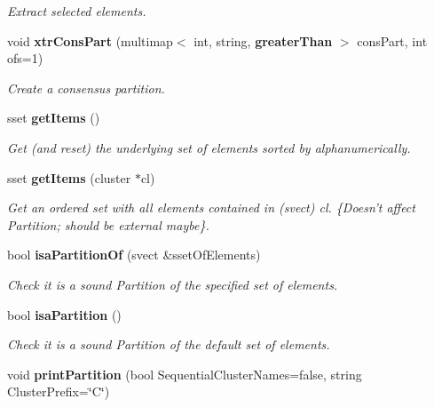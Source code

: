 \begin{CompactItemize}
\begin{CompactList}\small\item\em Extract selected elements. \item\end{CompactList}\item 
void {\bf xtr\-Cons\-Part} (multimap$<$ int, string, {\bf greater\-Than} $>$ cons\-Part, int ofs=1)\label{classPartition_a6}

\begin{CompactList}\small\item\em Create a consensus partition. \item\end{CompactList}\item 
sset {\bf get\-Items} ()\label{classPartition_a7}

\begin{CompactList}\small\item\em Get (and reset) the underlying set of elements sorted by alphanumerically. \item\end{CompactList}\item 
sset {\bf get\-Items} (cluster $\ast$cl)\label{classPartition_a8}

\begin{CompactList}\small\item\em Get an ordered set with all elements contained in (svect) cl. \{Doesn't affect Partition; should be external maybe\}. \item\end{CompactList}\item 
bool {\bf isa\-Partition\-Of} (svect \&sset\-Of\-Elements)
\begin{CompactList}\small\item\em Check it is a sound Partition of the specified set of elements. \item\end{CompactList}\item 
bool {\bf isa\-Partition} ()\label{classPartition_a10}

\begin{CompactList}\small\item\em Check it is a sound Partition of the default set of elements. \item\end{CompactList}\item 
void {\bf print\-Partition} (bool Sequential\-Cluster\-Names=false, string Cluster\-Prefix=\char`\"{}C\char`\"{})\label{classPartition_a11}


\end{CompactItemize}
